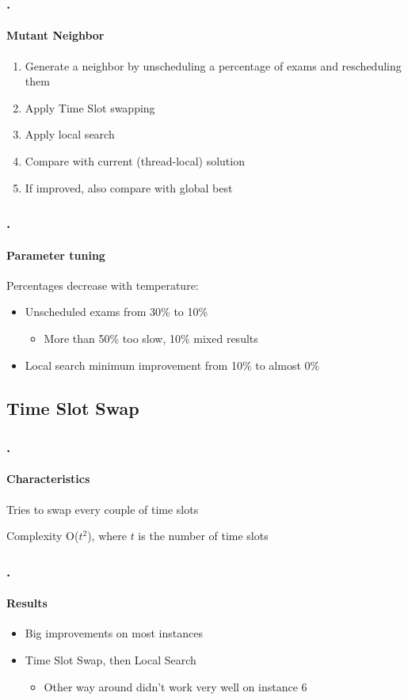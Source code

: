 \documentclass{beamer}
\begin{document}
\begin{frame}
\frametitle{\thesection.\thesubsection \ \insertsubsection}
\framesubtitle{Mutant Neighbor}
\begin{enumerate}
	\item Generate a neighbor by \alert{unscheduling a percentage of exams} and rescheduling them
	\item Apply Time Slot swapping
	\item Apply local search
	\item Compare with current (thread-local) solution
	\item If improved, also compare with global best
\end{enumerate}
\end{frame}

\begin{frame}
\frametitle{\thesection.\thesubsection \ \insertsubsection}
\framesubtitle{Parameter tuning}
	Percentages decrease with temperature:
\begin{itemize}

	\item Unscheduled exams from 30\% to 10\%
	\begin{itemize}
		\item More than 50\% too slow, 10\% mixed results %
	\end{itemize}
	\item Local search minimum improvement from 10\% to almost 0\%
\end{itemize}
\end{frame}

\subsection{Time Slot Swap}

\begin{frame}
\frametitle{\thesection.\thesubsection \ \insertsubsection}
   \framesubtitle{Characteristics}
   \begin{exampleblock} {Tries to swap every couple of time slots}

	
	Complexity O($t^2$), where $t$ is the number of time slots 

	\end{exampleblock}
\end{frame}
\begin{frame}
\frametitle{\thesection.\thesubsection \ \insertsubsection}
\framesubtitle{Results}
\begin{itemize}
	\item Big improvements on most instances
	\item Time Slot Swap, then Local Search
	\begin{itemize}
	\item Other way around didn't work very well on instance 6
	\end{itemize}
	
\end{itemize}
\end{frame}
\end{document}
